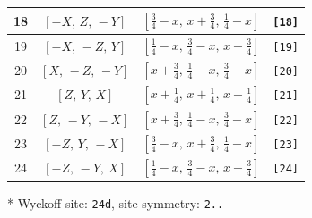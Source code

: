 \documentclass[fleqn,8pt]{jsarticle}
\begin{document}
\begin{longtable}{cccc}
18 & $\left[ - X,\, Z,\, - Y \right]$ & $\left[ \frac{3}{4} - x,\, x + \frac{3}{4},\, \frac{1}{4} - x \right]$ & {\tt [18]} \\ \hline
19 & $\left[ - X,\, - Z,\, Y \right]$ & $\left[ \frac{1}{4} - x,\, \frac{3}{4} - x,\, x + \frac{3}{4} \right]$ & {\tt [19]} \\ \hline
20 & $\left[ X,\, - Z,\, - Y \right]$ & $\left[ x + \frac{3}{4},\, \frac{1}{4} - x,\, \frac{3}{4} - x \right]$ & {\tt [20]} \\ \hline
21 & $\left[ Z,\, Y,\, X \right]$ & $\left[ x + \frac{1}{4},\, x + \frac{1}{4},\, x + \frac{1}{4} \right]$ & {\tt [21]} \\ \hline
22 & $\left[ Z,\, - Y,\, - X \right]$ & $\left[ x + \frac{3}{4},\, \frac{1}{4} - x,\, \frac{3}{4} - x \right]$ & {\tt [22]} \\ \hline
23 & $\left[ - Z,\, Y,\, - X \right]$ & $\left[ \frac{3}{4} - x,\, x + \frac{3}{4},\, \frac{1}{4} - x \right]$ & {\tt [23]} \\ \hline
24 & $\left[ - Z,\, - Y,\, X \right]$ & $\left[ \frac{1}{4} - x,\, \frac{3}{4} - x,\, x + \frac{3}{4} \right]$ & {\tt [24]} \\
\end{longtable}
* Wyckoff site: {\tt 24d}, site symmetry: {\tt 2..}
\renewcommand{\arraystretch}{1.2}
\end{document}
